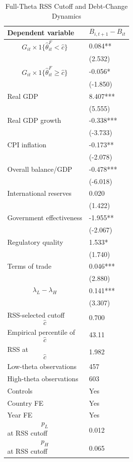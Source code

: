 \begin{table}[H]\centering
\begin{threeparttable}
\caption{Full-Theta RSS Cutoff and Debt-Change Dynamics}
\label{tab:deltaB_rss_cutoff_fulltheta}
\scriptsize
\begin{tabularx}{\textwidth}{lY}
\toprule
Dependent variable & $$B_{i,t+1}-B_{it}$$ \\
\midrule
$$G_{it}\times 1\{\widehat{\theta}^{F}_{it}<\widehat{c}\}$$ & 0.084** \\
 & (2.532) \\
$$G_{it}\times 1\{\widehat{\theta}^{F}_{it}\geq\widehat{c}\}$$ & -0.056* \\
 & (-1.850) \\
Real GDP & 8.407*** \\
 & (5.555) \\
Real GDP growth & -0.338*** \\
 & (-3.733) \\
CPI inflation & -0.173** \\
 & (-2.078) \\
Overall balance/GDP & -0.478*** \\
 & (-6.018) \\
International reserves & 0.020 \\
 & (1.422) \\
Government effectiveness & -1.955** \\
 & (-2.067) \\
Regulatory quality & 1.533* \\
 & (1.740) \\
Terms of trade & 0.046*** \\
 & (2.880) \\
$$\lambda_L-\lambda_H$$ & 0.141*** \\
 & (3.307) \\
\midrule
RSS-selected cutoff $$\widehat{c}$$ & 0.700 \\
Empirical percentile of $$\widehat{c}$$ & 43.11 \\
RSS at $$\widehat{c}$$ & 1.982 \\
Low-theta observations & 457 \\
High-theta observations & 603 \\
Controls & Yes \\
Country FE & Yes \\
Year FE & Yes \\
$$p_L$$ at RSS cutoff & 0.012 \\
$$p_H$$ at RSS cutoff & 0.065 \\

\end{tabularx}
\end{threeparttable}
\end{table}
